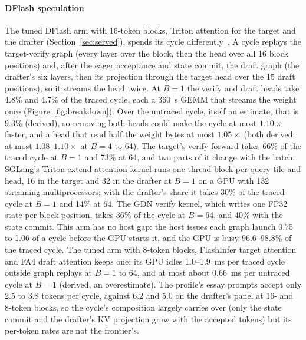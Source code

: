 \paragraph{DFlash speculation} The tuned DFlash arm with 16-token blocks, Triton attention for the target and the drafter (Section~\ref{sec:served}), spends its cycle differently~. A cycle replays the target-verify graph (every layer over the block, then the head over all 16 block positions) and, after the eager acceptance and state commit, the draft graph (the drafter's six layers, then its projection through the target head over the 15 draft positions), so it streams the head twice. At $B=1$ the verify and draft heads take 4.8\% and 4.7\% of the traced cycle, each a 360~\textmu s GEMM that streams the weight once (Figure~\ref{fig:breakdown}). Over the untraced cycle, itself an estimate, that is 9.3\% (derived), so removing both heads could make the cycle at most $1.10\times$ faster, and a head that read half the weight bytes at most $1.05\times$ (both derived; at most $1.08$--$1.10\times$ at $B=4$ to 64). The target's verify forward takes 66\% of the traced cycle at $B=1$ and 73\% at 64, and two parts of it change with the batch. SGLang's Triton extend-attention kernel runs one thread block per query tile and head, 16 in the target and 32 in the drafter at $B=1$ on a GPU with 132 streaming multiprocessors; with the drafter's share it takes 30\% of the traced cycle at $B=1$ and 14\% at 64. The GDN verify kernel, which writes one FP32 state per block position, takes 36\% of the cycle at $B=64$, and 40\% with the state commit. This arm has no host gap: the host issues each graph launch 0.75 to 1.06 of a cycle before the GPU starts it, and the GPU is busy 96.6--98.8\% of the traced cycle. The tuned arm with 8-token blocks, FlashInfer target attention and FA4 draft attention keeps one: its GPU idles 1.0--1.9~ms per traced cycle outside graph replays at $B=1$ to 64, and at most about 0.66~ms per untraced cycle at $B=1$ (derived, an overestimate). The profile's essay prompts accept only 2.5 to 3.8 tokens per cycle, against 6.2 and 5.0 on the drafter's panel at 16- and 8-token blocks, so the cycle's composition largely carries over (only the state commit and the drafter's KV projection grow with the accepted tokens) but its per-token rates are not the frontier's.

